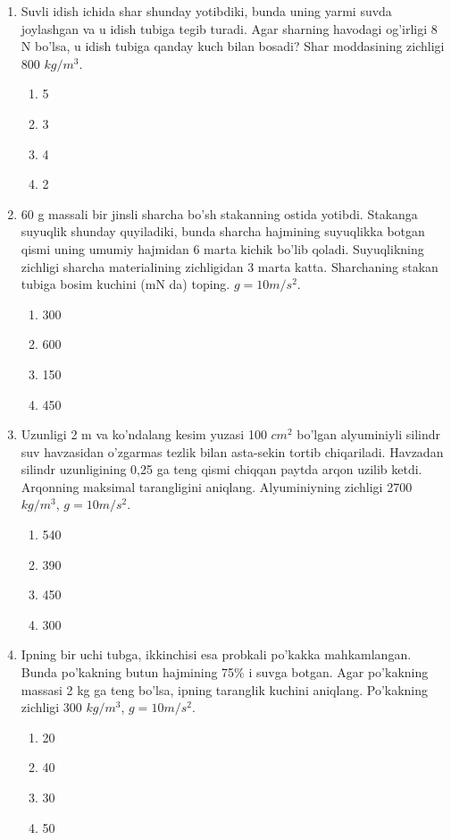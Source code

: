\begin{enumerate}
\item Suvli idish ichida shar shunday yotibdiki, bunda uning yarmi suvda joylashgan va u idish tubiga tegib turadi. Agar sharning havodagi og'irligi 8 N bo'lsa, u idish tubiga qanday kuch bilan bosadi? Shar moddasining zichligi 800 $kg/m^3$.
\begin{enumerate}[label=\Alph*)]
\item 5
\item 3
\item 4
\item 2
\end{enumerate}

\item 60 g massali bir jinsli sharcha bo'sh stakanning ostida yotibdi. Stakanga suyuqlik shunday quyiladiki, bunda sharcha hajmining suyuqlikka botgan qismi uning umumiy hajmidan 6 marta kichik bo'lib qoladi. Suyuqlikning zichligi sharcha materialining zichligidan 3 marta katta. Sharchaning stakan tubiga bosim kuchini (mN da) toping. $g=10m/s^2$.
\begin{enumerate}[label=\Alph*)]
\item 300
\item 600
\item 150
\item 450
\end{enumerate}

\item Uzunligi 2 m va ko'ndalang kesim yuzasi 100 $cm^2$ bo'lgan alyuminiyli silindr suv havzasidan o'zgarmas tezlik bilan asta-sekin tortib chiqariladi. Havzadan silindr uzunligining 0,25 ga teng qismi chiqqan paytda arqon uzilib ketdi. Arqonning maksimal tarangligini aniqlang. Alyuminiyning zichligi 2700 $kg/m^3$, $g=10m/s^2$.
\begin{enumerate}[label=\Alph*)]
\item 540
\item 390
\item 450
\item 300
\end{enumerate}

\item Ipning bir uchi tubga, ikkinchisi esa probkali po'kakka mahkamlangan. Bunda po'kakning butun hajmining 75\% i suvga botgan. Agar po'kakning massasi 2 kg ga teng bo'lsa, ipning taranglik kuchini aniqlang. Po'kakning zichligi 300 $kg/m^3$, $g=10m/s^2$.
\begin{enumerate}[label=\Alph*)]
\item 20
\item 40
\item 30
\item 50
\end{enumerate}


\end{enumerate}
